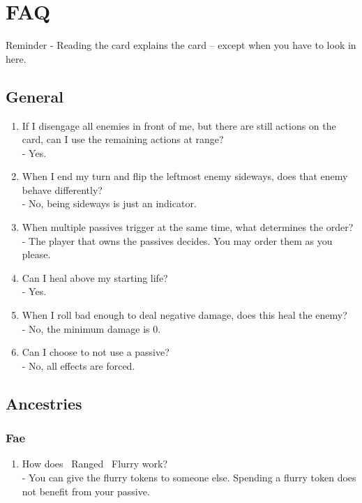 \section{FAQ}


\begin{tcolorbox}[colframe=blue, colback=white]
	Reminder - Reading the card explains the card -- except when you have to look in here.
\end{tcolorbox}

\subsection*{General}
\begin{enumerate}
	\item If I disengage all enemies in front of me, but there are still actions on the card, can I use the remaining actions at range?\\
	\hspace*{1cm}- Yes.
	\item When I end my turn and flip the leftmost enemy sideways, does that enemy behave differently?\\
	\hspace*{1cm}- No, being sideways is just an indicator.
	\item When multiple passives trigger at the same time, what determines the order?\\
	\hspace*{1cm}- The player that owns the passives decides. You may order them as you please.
	\item Can I heal above my starting life?\\
	\hspace*{1cm}- Yes.
	\item When I roll bad enough to deal negative damage, does this heal the enemy?\\
	\hspace*{1cm}- No, the minimum damage is 0.
	\item Can I choose to not use a passive?\\
	\hspace*{1cm}- No, all effects are forced.
\end{enumerate}


\subsection*{Ancestries}

\subsubsection*{Fae}
\begin{enumerate}
	\item How does \symRanged~Ranged \symFlurry~Flurry work?\\
	\hspace*{1cm}- You can give the flurry tokens to someone else. Spending a flurry token does not benefit from your passive.
\end{enumerate}


